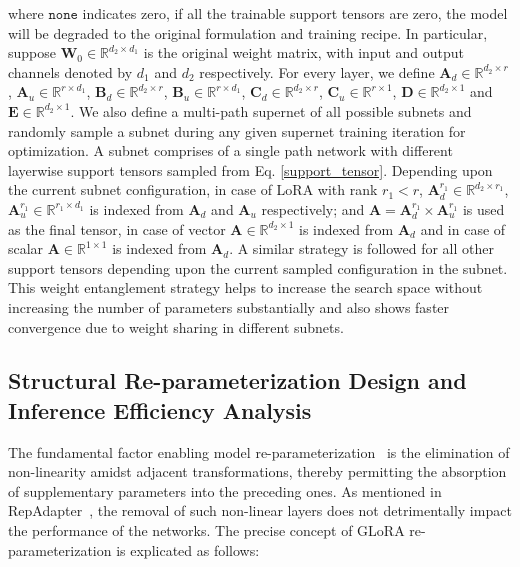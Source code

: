 where $\texttt{none}$ indicates zero, if all the trainable support tensors are zero, the model will be degraded to the original formulation and training recipe. In particular, suppose $\mathbf{W}_{0} \in \mathbb{R}^{d_{2} \times d_{1}}$ is the original weight matrix, with input and output channels denoted by $d_{1}$ and $d_{2}$ respectively. For every layer, we define $\mathbf{A}_{d} \in \mathbb{R}^{d_{2} \times r}$, $\mathbf{A}_{u} \in \mathbb{R}^{r \times d_{1}}$, $\mathbf{B}_{d} \in \mathbb{R}^{d_{2} \times r}$, $\mathbf{B}_{u} \in \mathbb{R}^{r \times d_{1}}$, $\mathbf{C}_{d} \in \mathbb{R}^{d_{2} \times r}$, $\mathbf{C}_{u} \in \mathbb{R}^{r \times 1}$, $\mathbf{D} \in \mathbb{R}^{d_{2} \times 1}$ and $\mathbf{E} \in \mathbb{R}^{d_{2} \times 1}$. We also define a multi-path supernet of all possible subnets and randomly sample a subnet during any given supernet training iteration for optimization. A subnet comprises of a single path network with different layerwise support tensors sampled from Eq. \ref{support_tensor}. Depending upon the current subnet configuration, in case of LoRA with rank $r_1 < r$, $\mathbf{A}_{d}^{r_1} \in \mathbb{R}^{d_{2} \times r_1}$, $\mathbf{A}_{u}^{r_1} \in \mathbb{R}^{r_1 \times d_{1}}$ is indexed from $\mathbf{A}_{d}$ and $\mathbf{A}_{u}$ respectively; and $\mathbf{A} = \mathbf{A}_{d}^{r_1} \times \mathbf{A}_{u}^{r_1}$ is used as the final tensor, in case of vector $\mathbf{A} \in \mathbb{R}^{d_{2} \times 1}$ is indexed from $\mathbf{A}_{d}$ and in case of scalar $\mathbf{A} \in \mathbb{R}^{1 \times 1}$ is indexed from $\mathbf{A}_{d}$. A similar strategy is followed for all other support tensors depending upon the current sampled configuration in the subnet. This weight entanglement strategy helps to increase the search space without increasing the number of parameters substantially and also shows faster convergence due to weight sharing in different subnets.

\subsection{Structural Re-parameterization Design and Inference Efficiency Analysis}

The fundamental factor enabling model re-parameterization~\citep{ding2021repvgg,hu2021lora} is the elimination of non-linearity amidst adjacent transformations, thereby permitting the absorption of supplementary parameters into the preceding ones. As mentioned in RepAdapter~\citep{luo2023towards}, the removal of such non-linear layers does not detrimentally impact the performance of the networks. The precise concept of GLoRA re-parameterization is explicated as follows:

